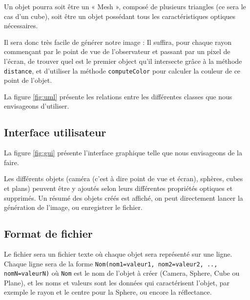 \documentclass[a4paper]{article}
\begin{document}
    Un objet pourra soit être un « Mesh », composé de plusieurs triangles (ce sera le cas
    d'un cube), soit être un objet possédant tous les caractéristiques optiques nécessaires.

    Il sera donc très facile de générer notre image : Il suffira, pour chaque rayon commençant par
    le point de vue de l'observateur et passant par un pixel de l'écran, de trouver quel est le premier
    object qu'il intersecte grâce à la méthode \verb+distance+, et d'utiliser la méthode \verb+computeColor+
    pour calculer la couleur de ce point de l'objet.

    La figure \ref{fig:uml} présente les relations entre les différentes classes
    que nous envisageons d'utiliser.

  \subsection{Interface utilisateur}
    La figure \ref{fig:gui} présente l'interface graphique telle que nous
    envisageons de la faire.

    Les différents objets (caméra (c'est à dire point de vue et écran),
    sphères, cubes et plans) peuvent être y ajoutés selon leurs différentes
    propriétés optiques et supprimés. Un résumé des objets créés est affiché, on
    peut directement lancer la génération de l'image, ou enregistrer le fichier.

  \subsection{Format de fichier}
    Le fichier sera un fichier texte où chaque objet sera représenté sur une
    ligne. Chaque ligne sera de la forme
    \verb+Nom(nom1=valeur1, nom2=valeur2, .., nomN=valeurN)+ où \verb+Nom+ est
    le nom de l'objet à créer (Camera, Sphere, Cube ou Plane), et les noms et
    valeurs sont les données qui caractérisent l'objet, par exemple le rayon
    et le centre pour la Sphere, ou encore la réflectance.
\end{document}
